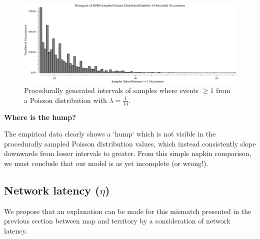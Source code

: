 \documentclass[11pt]{article}
\theoremstyle{plain}
\begin{document}
\begin{figure}[tph]
    \label{vis_poisson_samples_eventintervals_hist}
    \centering
\includegraphics[width=1.0\textwidth]{go-block-step/out/vis_poisson_samples_eventintervals_hist.png}
    \caption{
      Procedurally generated intervals of samples where events $\geq 1$ from
        a Poisson distribution with $\lambda = \frac{1}{14}$.
    }
\end{figure}


%

\pagebreak

\textbf{Where is the hump?}

The empirical data clearly shows a `hump` which is not visible in the
procedurally sampled Poisson distribution values,
which instead consistently slope downwards from lesser intervals to greater.
From this simple napkin comparison, we must conclude that our model is as yet
incomplete (or wrong!).

\subsection{\normalsize{Network latency ($\eta$)}}

We propose that an explanation can be made for this mismatch presented in the
previous section between map and territory by a consideration of network
latency.
\end{document}
